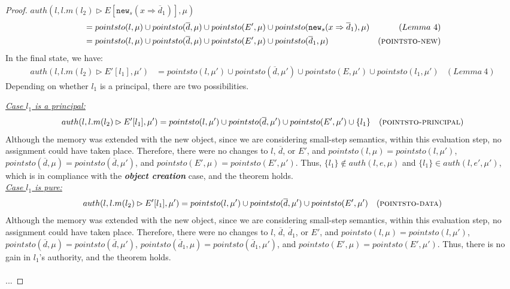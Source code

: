 \documentclass{llncs}
\newcommand{\keywadj}[1]{\mathtt{#1}}
\begin{document}
\begin{proof}
\noindent$auth(l, l.m(l_2) \rhd E[\keywadj{new}_s(x \Rightarrow \overline{d}_1)], \mu)$
\vspace{-7pt}
\begin{align*}
&= pointsto(l, \mu) \cup pointsto(\overline{d}, \mu) \cup pointsto(E', \mu) \cup pointsto(\keywadj{new}_s(x \Rightarrow \overline{d}_1), \mu) & (Lemma~4)\\
&= pointsto(l, \mu) \cup pointsto(\overline{d}, \mu) \cup pointsto(E', \mu) \cup pointsto(\overline{d}_1, \mu) & (\textsc{pointsto-new})
\end{align*}
In the final state, we have:
\begin{align*}
auth(l, l.m(l_2) \rhd E'[l_1], \mu') &= pointsto(l, \mu') \cup pointsto(\overline{d}, \mu') \cup pointsto(E, \mu') \cup pointsto(l_1, \mu') & (Lemma~4)
\end{align*}
Depending on whether $l_1$ is a principal, there are two possibilities.

\noindent\textit{\underline{Case $l_1$ is a principal:}}
\begin{align*}
auth(l, l.m(l_2) \rhd E'[l_1], \mu') &= pointsto(l, \mu') \cup pointsto(\overline{d}, \mu') \cup pointsto(E', \mu') \cup \{ l_1 \} & (\textsc{pointsto-principal})
\end{align*}
Although the memory was extended with the new object, since we are considering small-step semantics, within this evaluation step, no assignment could have taken place. Therefore, there were no changes to $l$, $\overline{d}$, or $E'$, and $pointsto(l, \mu) = pointsto(l, \mu')$, $pointsto(\overline{d}, \mu) = pointsto(\overline{d}, \mu')$, and $pointsto(E', \mu) = pointsto(E', \mu')$. Thus, $\{ l_1 \} \not\in auth(l, e, \mu)$ and $\{ l_1 \} \in auth(l, e', \mu')$, which is in compliance with the \textbf{\textit{object creation}} case, and the theorem holds.\\

\noindent\textit{\underline{Case $l_1$ is pure:}}
\begin{align*}
auth(l, l.m(l_2) \rhd E'[l_1], \mu') &= pointsto(l, \mu') \cup pointsto(\overline{d}, \mu') \cup pointsto(E', \mu') & (\textsc{pointsto-data})
\end{align*}
Although the memory was extended with the new object, since we are considering small-step semantics, within this evaluation step, no assignment could have taken place. Therefore, there were no changes to $l$, $\overline{d}$, $\overline{d}_1$, or $E'$, and $pointsto(l, \mu) = pointsto(l, \mu')$, $pointsto(\overline{d}, \mu) = pointsto(\overline{d}, \mu')$, $pointsto(\overline{d}_1, \mu) = pointsto(\overline{d}_1, \mu')$, and $pointsto(E', \mu) = pointsto(E', \mu')$. Thus, there is no gain in $l_1$'s authority, and the theorem holds.\\\\
...

\end{proof}
\end{document}
